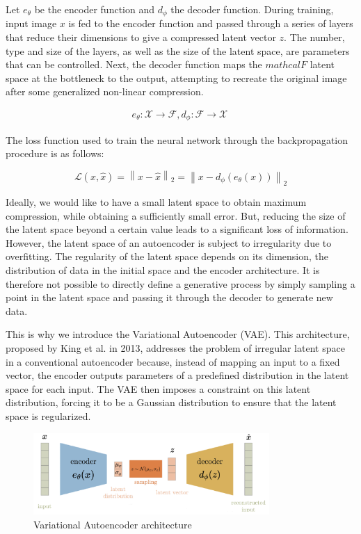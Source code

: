 \documentclass{article}
\begin{document}
Let $e_{\theta}$ be the encoder function and $d_{\phi}$ the decoder function. 
During training, input image $x$ is fed to the encoder function and passed through a series of layers that reduce their dimensions to give a compressed latent vector $z$. 
The number, type and size of the layers, as well as the size of the latent space, are parameters that can be controlled. 
Next, the decoder function maps the $mathcal{F}$ latent space at the bottleneck to the output, attempting to recreate the original image after some generalized non-linear compression. 

\begin{align*}
    e_{\theta}:\mathcal{X}\to \mathcal{F}, d_{\phi}:\mathcal{F}\to \mathcal{X}\
\end{align*}


The loss function used to train the neural network through the backpropagation procedure is as follows: 

\[\mathcal{L}(x,\hat{x})=\left\| x-\hat{x}\right\|_{2}=\left\| x-d_{\phi}(e_{\theta}(x)) \right\|_{2}\]

Ideally, we would like to have a small latent space to obtain maximum compression, while obtaining a sufficiently small error. 
But, reducing the size of the latent space beyond a certain value leads to a significant loss of information.
However, the latent space of an autoencoder is subject to irregularity due to overfitting. 
The regularity of the latent space depends on its dimension, the distribution of data in the initial space and the encoder architecture. 
It is therefore not possible to directly define a generative process by simply sampling a point in the latent space and passing it through the decoder to generate new data.

This is why we introduce the Variational Autoencoder (VAE). 
This architecture, proposed by King et al. in 2013, addresses the problem of irregular latent space in a conventional autoencoder because, instead of mapping an input to a fixed vector, the encoder outputs parameters of a predefined distribution in the latent space for each input. 
The VAE then imposes a constraint on this latent distribution, forcing it to be a Gaussian distribution to ensure that the latent space is regularized.

\begin{figure}[H]
    \centering
    \includegraphics[width=0.8\textwidth]{images/vae.png}
    \caption{Variational Autoencoder architecture}
\end{figure}
\end{document}
